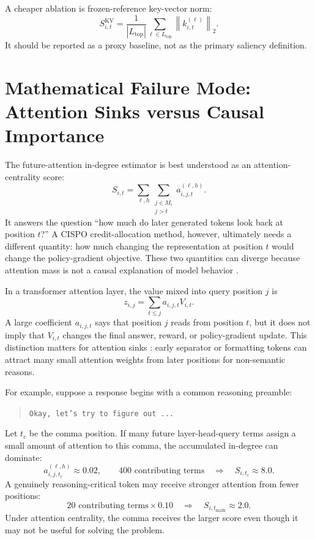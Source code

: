 \documentclass[11pt]{article}
\begin{document}
A cheaper ablation is frozen-reference key-vector norm:
\begin{equation}
  S^{\mathrm{KV}}_{i,t}
  =
  \frac{1}{|L_{\mathrm{top}}|}
  \sum_{\ell \in L_{\mathrm{top}}}
  \left\|k^{(\ell)}_{i,t}\right\|_2.
\end{equation}
It should be reported as a proxy baseline, not as the primary saliency
definition.

\section{Mathematical Failure Mode: Attention Sinks versus Causal Importance}

The future-attention in-degree estimator is best understood as an
attention-centrality score:
\begin{equation}
  S_{i,t}
  =
  \sum_{\ell,h}
  \sum_{\substack{j \in M_i \\ j > t}}
  a^{(\ell,h)}_{i,j,t}.
\end{equation}
It answers the question ``how much do later generated tokens look back at
position $t$?'' A CISPO credit-allocation method, however, ultimately needs a
different quantity:
how much changing the representation at position $t$ would change the
policy-gradient objective. These two quantities can diverge because attention
mass is not a causal explanation of model behavior \cite{jain2019attention}.

In a transformer attention layer, the value mixed into query position $j$ is
\begin{equation}
  z_{i,j}
  =
  \sum_{t \leq j} a_{i,j,t} V_{i,t}.
\end{equation}
A large coefficient $a_{i,j,t}$ says that position $j$ reads from position
$t$, but it does not imply that $V_{i,t}$ changes the final answer, reward, or
policy-gradient update. This distinction matters for attention sinks
\cite{xiao2024streamingllm}: early separator or formatting tokens can attract
many small attention weights from later positions for non-semantic reasons.

For example, suppose a response begins with a common reasoning preamble:
\begin{quote}
\texttt{Okay, let's try to figure out ...}
\end{quote}
Let $t_c$ be the comma position. If many future layer-head-query terms assign a
small amount of attention to this comma, the accumulated in-degree can dominate:
\begin{equation}
  a^{(\ell,h)}_{i,j,t_c} \approx 0.02,
  \qquad
  400 \text{ contributing terms}
  \quad\Rightarrow\quad
  S_{i,t_c} \approx 8.0.
\end{equation}
A genuinely reasoning-critical token may receive stronger attention from fewer
positions:
\begin{equation}
  20 \text{ contributing terms} \times 0.10
  \quad\Rightarrow\quad
  S_{i,t_{\mathrm{math}}} \approx 2.0.
\end{equation}
Under attention centrality, the comma receives the larger score even though it
may not be useful for solving the problem.
\end{document}
